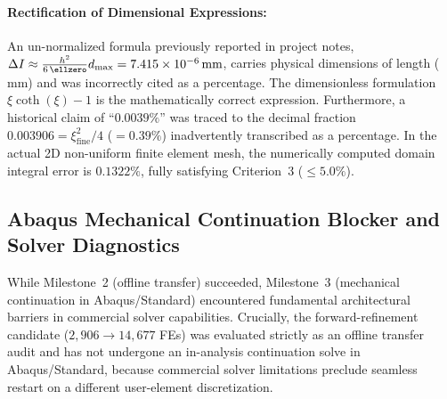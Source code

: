 \begin{enumerate}
\paragraph{Rectification of Dimensional Expressions:}
An un-normalized formula previously reported in project notes, $\Delta I \approx \frac{h^2}{6\,\ellzero} d_{\max} = 7.415 \times 10^{-6}\,\mathrm{mm}$, carries physical dimensions of length ($\mathrm{mm}$) and was incorrectly cited as a percentage. The dimensionless formulation $\xi \coth(\xi) - 1$ is the mathematically correct expression. Furthermore, a historical claim of ``$0.0039\%$'' was traced to the decimal fraction $0.003906 = \xi_{\mathrm{fine}}^2 / 4$ ($= 0.39\%$) inadvertently transcribed as a percentage. In the actual 2D non-uniform finite element mesh, the numerically computed domain integral error is $0.1322\%$, fully satisfying Criterion~3 ($\le 5.0\%$).

\subsection{Abaqus Mechanical Continuation Blocker and Solver Diagnostics}
\label{subsec:method_c_solver_blocker}

While Milestone~2 (offline transfer) succeeded, Milestone~3 (mechanical continuation in Abaqus/Standard) encountered fundamental architectural barriers in commercial solver capabilities. Crucially, the forward-refinement candidate ($2{,}906 \to 14{,}677$ FEs) was evaluated strictly as an offline transfer audit and has not undergone an in-analysis continuation solve in Abaqus/Standard, because commercial solver limitations preclude seamless restart on a different user-element discretization.


\end{enumerate}
